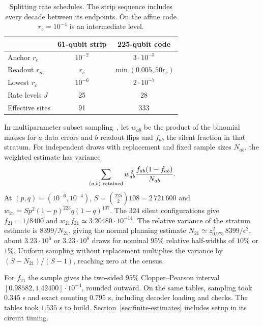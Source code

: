 \documentclass[10pt,twocolumn]{article}
\theoremstyle{definition}
\begin{document}
\begin{table}[H]
\centering\small
\setlength{\tabcolsep}{3pt}
\caption{Splitting rate schedules. The strip sequence includes every
decade between its endpoints. On the affine code $r_c=10^{-4}$ is
an intermediate level.}
\label{tab:splitting-schedules}
\smallskip
\begin{tabular}{@{}lcc@{}}
\toprule
 & 61-qubit strip & 225-qubit code\\
\midrule
Anchor $r_c$       & $10^{-2}$ & $3\cdot10^{-3}$\\
Readout $r_m$      & $r_c$ & $\min(0.005,50r_c)$\\
Lowest $r_c$       & $10^{-6}$ & $2\cdot10^{-7}$\\
Rate levels $J$    & 25 & 28\\
Effective sites    & 91 & 333\\
\bottomrule
\end{tabular}
\end{table}

In multiparameter subset sampling~\cite[Eq.~(10)]{GMB19}, let $w_{ab}$
be the product of the binomial masses for $a$ data errors and $b$
readout flips and $f_{ab}$ the silent fraction in that stratum. For
independent draws with replacement and fixed sample sizes $N_{ab}$,
the weighted estimate has variance
\[
 \sum_{(a,b)\ {\rm retained}}
       w_{ab}^{\,2}\frac{f_{ab}(1-f_{ab})}{N_{ab}} .
\]
At $(p,q)=(10^{-6},10^{-4})$,
$S=\binom{225}{2}108=2\,721\,600$
and $w_{21}=S p^2(1-p)^{223}q(1-q)^{107}$.
The $324$ silent configurations give $f_{21}=1/8400$ and
$w_{21}f_{21}\simeq3.20480\cdot10^{-14}$. The relative variance of
the stratum estimate is $8399/N_{21}$, giving the normal planning estimate
$N_{21}\simeq z_{0.975}^2\,8399/\epsilon^2$, about $3.23\cdot10^6$
or $3.23\cdot10^8$ draws for nominal $95\%$ relative half-widths
of $10\%$ or $1\%$. Uniform sampling without replacement multiplies
the variance by $(S-N_{21})/(S-1)$, reaching zero at the census.

For $f_{21}$ the sample gives the two-sided $95\%$ Clopper--Pearson
interval~\cite{Clopper34} $[0.98582,1.42400]\cdot10^{-4}$, rounded
outward. On the same tables, sampling took $0.345$ s and exact counting
$0.795$ s, including decoder loading and checks. The tables took
$1.535$ s to build. Section~\ref{sec:finite-estimates} includes setup
in its circuit timing.

\raggedend
\end{document}
